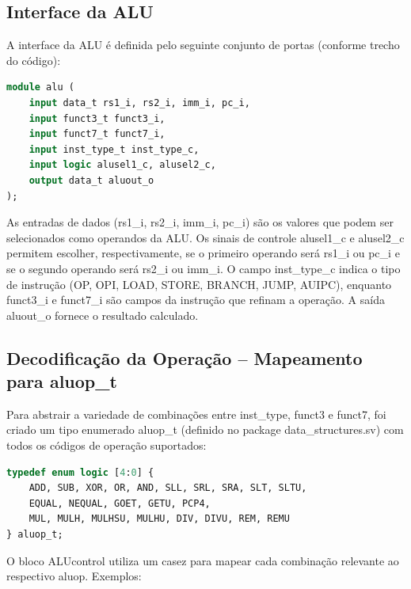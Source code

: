 \documentclass[
	12pt,				%
	oneside,
	a4paper,			%
	english,			%
	french,				%
	spanish,			%
	brazil,				%
	]{abntex2}
\begin{document}
\subsection{Interface da ALU}
A interface da ALU é definida pelo seguinte conjunto de portas (conforme trecho do código):

\begin{lstlisting}[language=SystemVerilog, caption={Interface da ALU}, label=lst:interfacealu]
module alu (
    input data_t rs1_i, rs2_i, imm_i, pc_i,
    input funct3_t funct3_i,
    input funct7_t funct7_i,
    input inst_type_t inst_type_c,
    input logic alusel1_c, alusel2_c,
    output data_t aluout_o
);
\end{lstlisting}

As entradas de dados (rs1\_i, rs2\_i, imm\_i, pc\_i) são os valores que podem ser selecionados como operandos da ALU. Os sinais de controle alusel1\_c e alusel2\_c permitem escolher, respectivamente, se o primeiro operando será rs1\_i ou pc\_i e se o segundo operando será rs2\_i ou imm\_i. O campo inst\_type\_c indica o tipo de instrução (OP, OPI, LOAD, STORE, BRANCH, JUMP, AUIPC), enquanto funct3\_i e funct7\_i são campos da instrução que refinam a operação. A saída aluout\_o fornece o resultado calculado.

\subsection{Decodificação da Operação – Mapeamento para aluop\_t}
Para abstrair a variedade de combinações entre inst\_type, funct3 e funct7, foi criado um tipo enumerado aluop\_t (definido no package data\_structures.sv) com todos os códigos de operação suportados:

\begin{lstlisting}[language=SystemVerilog, caption={Decodificação da operação}, label=lst:opdecode]
typedef enum logic [4:0] {
    ADD, SUB, XOR, OR, AND, SLL, SRL, SRA, SLT, SLTU,
    EQUAL, NEQUAL, GOET, GETU, PCP4,
    MUL, MULH, MULHSU, MULHU, DIV, DIVU, REM, REMU
} aluop_t;
\end{lstlisting}

O bloco ALUcontrol utiliza um casez para mapear cada combinação relevante ao respectivo aluop. Exemplos:
\end{document}

